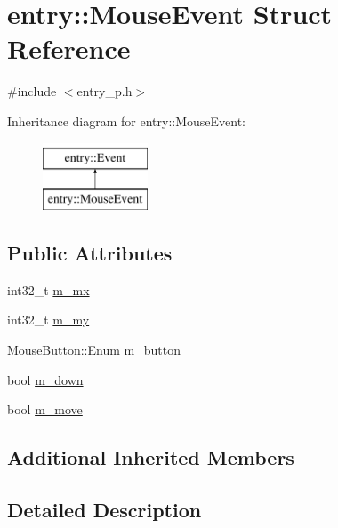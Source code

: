 \hypertarget{structentry_1_1_mouse_event}{\section{entry\+:\+:Mouse\+Event Struct Reference}
\label{structentry_1_1_mouse_event}
}


{\ttfamily \#include $<$entry\+\_\+p.\+h$>$}

Inheritance diagram for entry\+:\+:Mouse\+Event\+:\begin{figure}[H]
\begin{center}
\leavevmode
\includegraphics[height=2.000000cm]{structentry_1_1_mouse_event}
\end{center}
\end{figure}
\subsection*{Public Attributes}
\begin{DoxyCompactItemize}
\item 
int32\+\_\+t \hyperlink{structentry_1_1_mouse_event_a850d2acae08dfb96c4ec9cfcc04fe4ca}{m\+\_\+mx}
\item 
int32\+\_\+t \hyperlink{structentry_1_1_mouse_event_a983a69157c19a7ed62cac2456c0c26e2}{m\+\_\+my}
\item 
\hyperlink{structentry_1_1_mouse_button_a047d99f30fac4b4483eeb96d815fe54e}{Mouse\+Button\+::\+Enum} \hyperlink{structentry_1_1_mouse_event_a8cdc0d9dd11adc7b657821c1a839da86}{m\+\_\+button}
\item 
bool \hyperlink{structentry_1_1_mouse_event_a6609af582bf1fd72b9b4e7745069ef77}{m\+\_\+down}
\item 
bool \hyperlink{structentry_1_1_mouse_event_af612d206104bf2c27881b8dc6d64774c}{m\+\_\+move}
\end{DoxyCompactItemize}
\subsection*{Additional Inherited Members}


\subsection{Detailed Description}


